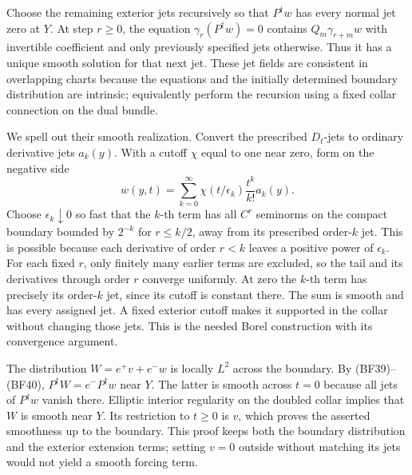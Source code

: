 \documentclass[
  11pt,
]{article}
\makeatletter
\let\ReaderOriginalAnchorStart\hyper@anchorstart
\let\ReaderOriginalAnchorEnd\hyper@anchorend
\let\ReaderPendingAliases\@empty
\def\ReaderArmAliases#1{\gdef\ReaderPendingAliases{#1}}
\def\hyper@anchorstart#1{\ReaderIfNativeAnchorTF{#1}{\ReaderPendingAliases\global\let\ReaderPendingAliases\@empty}{}\ReaderOriginalAnchorStart{#1}}
\makeatother
\begin{document}
Choose the remaining exterior jets recursively so that \(P^\dagger w\)
has every normal jet zero at \(Y\). At step \(r\geq0\), the equation
\(\gamma_r(P^\dagger w)=0\) contains \(Q_m\gamma_{r+m}w\) with
invertible coefficient and only previously specified jets otherwise.
Thus it has a unique smooth solution for that next jet. These jet fields
are consistent in overlapping charts because the equations and the
initially determined boundary distribution are intrinsic; equivalently
perform the recursion using a fixed collar connection on the dual
bundle.

We spell out their smooth realization. Convert the prescribed
\(D_t\)-jets to ordinary derivative jets \(a_k(y)\). With a cutoff
\(\chi\) equal to one near zero, form on the negative side \[
 w(y,t)=\sum_{k=0}^\infty\chi(t/\epsilon_k)\frac{t^k}{k!}a_k(y).
 \tag{BF41}
\] Choose \(\epsilon_k\downarrow0\) so fast that the \(k\)-th term has
all \(C^r\) seminorms on the compact boundary bounded by \(2^{-k}\) for
\(r\leq k/2\), away from its prescribed order-\(k\) jet. This is
possible because each derivative of order \(r<k\) leaves a positive
power of \(\epsilon_k\). For each fixed \(r\), only finitely many
earlier terms are excluded, so the tail and its derivatives through
order \(r\) converge uniformly. At zero the \(k\)-th term has precisely
its order-\(k\) jet, since its cutoff is constant there. The sum is
smooth and has every assigned jet. A fixed exterior cutoff makes it
supported in the collar without changing those jets. This is the needed
Borel construction with its convergence argument.

The distribution \(W=e^+v+e^-w\) is locally \(L^2\) across the boundary.
By (BF39)--(BF40), \(P^\dagger W=e^-P^\dagger w\) near \(Y\). The latter
is smooth across \(t=0\) because all jets of \(P^\dagger w\) vanish
there. Elliptic interior regularity on the doubled collar implies that
\(W\) is smooth near \(Y\). Its restriction to \(t\geq0\) is \(v\),
which proves the asserted smoothness up to the boundary. This proof
keeps both the boundary distribution and the exterior extension terms;
setting \(v=0\) outside without matching its jets would not yield a
smooth forcing term.

\ReaderArmAliases{\ReaderOriginalAnchorStart{AN03-GFB-013}\ReaderOriginalAnchorEnd\begingroup\expandafter\def\csname @currentHref\endcsname{AN03-GFB-013}\label{AN03-GFB-013}\endgroup\ReaderOriginalAnchorStart{an03-gfb-013-all-solvability-obstructions-and-the-stable-index}\ReaderOriginalAnchorEnd\begingroup\expandafter\def\csname @currentHref\endcsname{an03-gfb-013-all-solvability-obstructions-and-the-stable-index}\label{an03-gfb-013-all-solvability-obstructions-and-the-stable-index}\endgroup\ReaderOriginalAnchorStart{13-all-solvability-obstructions-and-the-stable-index}\ReaderOriginalAnchorEnd\begingroup\expandafter\def\csname @currentHref\endcsname{13-all-solvability-obstructions-and-the-stable-index}\label{13-all-solvability-obstructions-and-the-stable-index}\endgroup\ReaderOriginalAnchorStart{all-solvability-obstructions-and-the-stable-index}\ReaderOriginalAnchorEnd}
\end{document}

